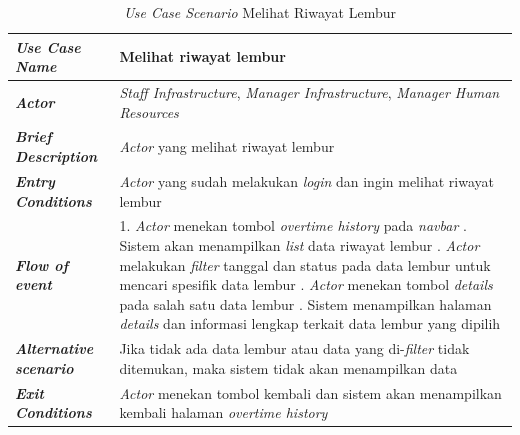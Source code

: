 \FloatBarrier
\begin{longtable}{ |p{6cm}|p{8cm}|}
\caption{\textit{Use Case Scenario} Melihat Riwayat Lembur}\label{tab:use-case-scenario-melihat-riwayat-lembur} 
\\
\hline
\textbf{\textit{Use Case Name}}
&Melihat riwayat lembur
\\ \hline

\textbf{\textit{Actor}}
&\textit{Staff Infrastructure}, \textit{Manager Infrastructure}, \textit{Manager Human Resources}
\\ \hline

\textbf{\textit{Brief Description}}
&\textit{Actor} yang melihat riwayat lembur
\\ \hline

\textbf{\textit{Entry Conditions}}
&\textit{Actor} yang sudah melakukan \textit{login} dan ingin melihat riwayat lembur
\\ \hline

\textbf{\textit{Flow of event}}
&1. \textit{Actor} menekan tombol \textit{overtime history} pada \textit{navbar}
\newline
2. Sistem akan menampilkan \textit{list} data riwayat lembur
\newline
3. \textit{Actor} melakukan \textit{filter} tanggal dan status pada data lembur untuk mencari spesifik data lembur
\newline
4. \textit{Actor} menekan tombol \textit{details} pada salah satu data lembur
\newline
5. Sistem menampilkan halaman \textit{details} dan informasi lengkap terkait data lembur yang dipilih
\newline
\\ \hline

\textbf{\textit{Alternative scenario}}
&Jika tidak ada data lembur atau data yang di-\textit{filter} tidak ditemukan, maka sistem tidak akan menampilkan data
\\ \hline

\textbf{\textit{Exit Conditions}}
&\textit{Actor} menekan tombol kembali dan sistem akan menampilkan kembali halaman \textit{overtime history}
\\ \hline
\end{longtable}

